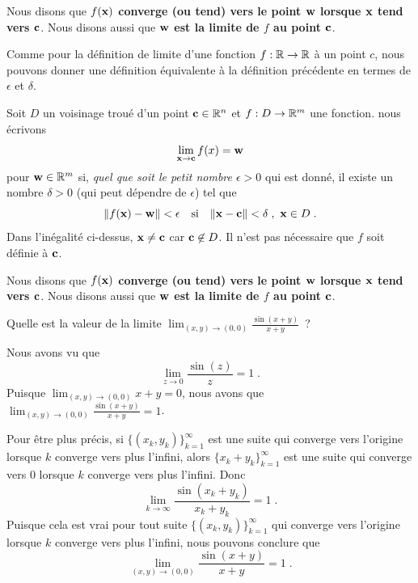 {\begin{focus}{\dfn}
Nous disons que
{\bfseries $f(\mathbf{x})$ converge (ou tend) vers le point $\mathbf{w}$
lorsque $\mathbf{x}$ tend vers $\mathbf{c}$}.  Nous disons aussi que
{\bfseries $\mathbf{w}$ est la limite de $f$ au point $\mathbf{c}$}.
\end{focus}

Comme pour la définition de limite d'une fonction
$f:\mathbb{R}\rightarrow \mathbb{R}$ à un point $c$, nous pouvons donner une
définition équivalente à la définition précédente en termes de
$\epsilon$ et $\delta$.

\begin{focus}[\theory]{\dfn} 
Soit $D$ un voisinage troué d'un point $\mathbf{c} \in \mathbb{R}^n$ et
$f:D\rightarrow \mathbb{R}^m$ une fonction.  nous écrivons
\[
\lim_{\mathbf{x}\rightarrow \mathbf{c}} f(x) = \mathbf{w}
\]
pour $\mathbf{w}\in \mathbb{R}^m$ si,
{\em quel que soit le petit nombre $\epsilon >0$}
qui est donné, il existe un nombre $\delta >0$ (qui peut dépendre
de $\epsilon$) tel que
\[
\|f(\mathbf{x}) - \mathbf{w}\| < \epsilon  \quad \text{si} \quad 
\|\mathbf{x} - \mathbf{c}\| < \delta\; ,\ \mathbf{x} \in D \; .
\]
Dans l'inégalité ci-dessus, $\mathbf{x} \neq \mathbf{c}$ car
$\mathbf{c}\not\in D$.  Il n'est pas nécessaire que $f$ soit
définie à $\mathbf{c}$.

Nous disons que
{\bfseries $f(\mathbf{x})$ converge (ou tend) vers le point $\mathbf{w}$
lorsque $\mathbf{x}$ tend vers $\mathbf{c}$}.  Nous disons aussi que
{\bfseries $\mathbf{w}$ est la limite de $f$ au point $\mathbf{c}$}.
\end{focus}

\begin{egg}
Quelle est la valeur de la limite
$\displaystyle \lim_{(x,y)\rightarrow (0,0)} \frac{\sin(x+y)}{x+y}$\ ?

Nous avons vu que
\[
\lim_{z\rightarrow 0} \frac{\sin(z)}{z} = 1 \; .
\]
Puisque $\displaystyle \lim_{(x,y)\rightarrow (0,0)} x + y = 0$,
nous avons que
$\displaystyle \lim_{(x,y)\rightarrow (0,0)} \frac{\sin(x+y)}{x+y} = 1$.

Pour être plus précis, si $\displaystyle \{ (x_k,y_k) \}_{k=1}^\infty$
est une suite qui converge vers l'origine lorsque $k$ converge vers
plus l'infini, alors $\displaystyle \{ x_k+y_k \}_{k=1}^\infty$ est
une suite qui converge vers $0$ lorsque $k$ converge vers plus
l'infini.  Donc
\[
\lim_{k\rightarrow \infty} \frac{\sin(x_k+y_k)}{x_k+y_k} = 1 \; .
\]
Puisque cela est vrai pour tout suite
$\displaystyle \{ (x_k,y_k) \}_{k=1}^\infty$ qui converge vers
l'origine lorsque $k$ converge vers plus l'infini, nous pouvons conclure
que
\[
\lim_{(x,y)\rightarrow (0,0)} \frac{\sin(x+y)}{x+y} = 1 \; .
\]
\label{sinxsurx}
\end{egg}

}
